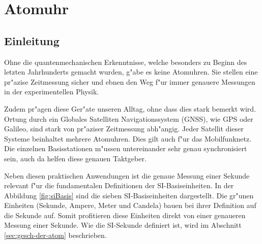 \chapter{Atomuhr\label{chapter:atomuhr}}
\begin{refsection}

\section{Einleitung}
%

Ohne die quantenmechanischen Erkenntnisse, welche besonders zu Beginn
des letzten Jahrhunderts gemacht wurden, g"abe es keine Atomuhren.
Sie stellen eine pr"azise Zeitmessung sicher und ebnen den Weg f"ur
immer genauere Messungen in der experimentellen Physik.

Zudem pr"agen diese Ger"ate unseren Alltag, ohne dass dies stark
bemerkt wird.  Ortung durch ein Globales Satelliten Navigationssystem
(GNSS), wie GPS oder Galileo, sind stark von pr"aziser Zeitmessung
abh"angig.  Jeder Satellit dieser Systeme beinhaltet mehrere
Atomuhren.  Dies gilt auch f"ur das Mobilfunknetz. Die einzelnen
Basisstationen m"ussen untereinander sehr genau synchronisiert sein,
auch da helfen diese genauen Taktgeber.

Neben diesen praktischen Anwendungen ist die genaue Messung einer
Sekunde relevant f"ur die fundamentalen Definitionen der
SI-Basiseinheiten. In der Abbildung \ref{fig:siBasis} sind die sieben
SI-Basis\-ein\-hei\-ten dargestellt.  Die gr"unen Einheiten (Sekunde,
Ampere, Meter und Candela) bauen bei ihrer Definition auf die Sekunde
auf.  Somit profitieren diese Einheiten direkt von einer genaueren
Messung einer Sekunde.  Wie die SI-Sekunde definiert ist, wird im
Abschnitt \ref{sec:gesch-der-atom} beschrieben.

\begin{figure}
  \centering
\end{figure}
\end{refsection}

